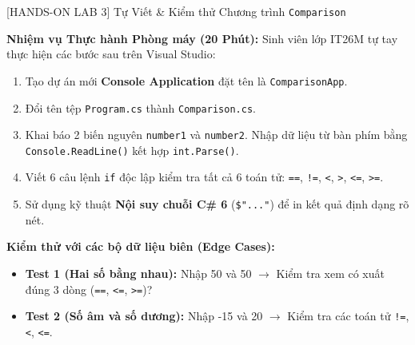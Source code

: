 \documentclass[aspectratio=169, 10pt]{beamer}
\begin{document}
\begin{frame}{[HANDS-ON LAB 3] Tự Viết \& Kiểm thử Chương trình \texttt{Comparison}}
  \begin{block}{\textbf{Nhiệm vụ Thực hành Phòng máy (20 Phút):}}
    Sinh viên lớp IT26M tự tay thực hiện các bước sau trên Visual Studio:
    \begin{enumerate}\small
      \item Tạo dự án mới \textbf{Console Application} đặt tên là \texttt{ComparisonApp}.
      \item Đổi tên tệp \texttt{Program.cs} thành \texttt{Comparison.cs}.
      \item Khai báo 2 biến nguyên \texttt{number1} và \texttt{number2}. Nhập dữ liệu từ bàn phím bằng \texttt{Console.ReadLine()} kết hợp \texttt{int.Parse()}.
      \item Viết 6 câu lệnh \texttt{if} độc lập kiểm tra tất cả 6 toán tử: \texttt{==}, \texttt{!=}, \texttt{<}, \texttt{>}, \texttt{<=}, \texttt{>=}.
      \item Sử dụng kỹ thuật \textbf{Nội suy chuỗi C\# 6} (\texttt{\$"..."}) để in kết quả định dạng rõ nét.
    \end{enumerate}
  \end{block}

  \begin{exampleblock}{\textbf{Kiểm thử với các bộ dữ liệu biên (Edge Cases):}}
    \begin{itemize}\small
      \item \textbf{Test 1 (Hai số bằng nhau):} Nhập 50 và 50 $\to$ Kiểm tra xem có xuất đúng 3 dòng (\texttt{==}, \texttt{<=}, \texttt{>=})?
      \item \textbf{Test 2 (Số âm và số dương):} Nhập -15 và 20 $\to$ Kiểm tra các toán tử \texttt{!=}, \texttt{<}, \texttt{<=}.
    \end{itemize}
  \end{exampleblock}
\end{frame}
\end{document}
